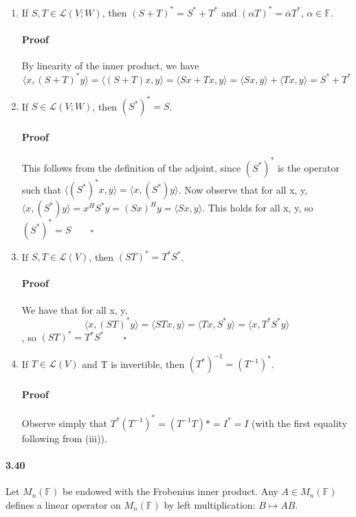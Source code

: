 \documentclass[letterpaper,12pt]{article}
\theoremstyle{definition}
\begin{document}
\begin{enumerate}[label=(\roman*)]

\item If $S, T \in \mathscr{L}(V;W)$, then $(S + T)^* = S^* + T^* $ and $(\alpha T)^* =  \overline{\alpha}T^*$, $\alpha \in \mathds{F}$.

\paragraph{Proof} By linearity of the inner product, we have
$$\langle x, (S + T)^*y \rangle = \langle (S + T)x, y \rangle 
=\langle Sx + Tx, y \rangle = \langle Sx , y \rangle + \langle Tx, y \rangle = S^* + T^* $$

\item If $S \in \mathscr{L}(V;W)$, then $(S^*)^* = S$. 

\paragraph{Proof} This follows from the definition of the adjoint, since $(S^*)^*$ is the  operator such that $\langle (S^*)^*x, y\rangle = \langle x, (S^*)y\rangle$. Now observe that for all x, y, $\langle x, (S^*)y\rangle = x^HS^*y = (Sx)^Hy = \langle Sx, y \rangle $. This holds for all x, y, so $(S^*)^* = S \qquad \square$

\item If $S, T \in \mathscr{L}(V)$, then $(ST)^* = T^*S^* $.

\paragraph{Proof} We have that for all x, y, 
$$\langle x, (ST)^*y \rangle = \langle STx, y \rangle = \langle Tx, S^*y \rangle = \langle x, T^*S^*y \rangle$$, so $(ST)^* = T^*S^* \qquad \square$

\item If $T \in \mathscr{L}(V)$ and T is invertible, then $(T^*)^{-1} = (T^{-1})^*$.

\paragraph{Proof } Observe simply that $T^*(T^{-1})^* = (T^{-1}T)* = I^* = I$ (with the first equality following from (iii)).

\end{enumerate}


\paragraph{3.40} Let $M_n(\mathds{F})$ be endowed with the Frobenius inner product. Any $A \in M_n(\mathds{F})$ defines a linear operator on $M_n(\mathds{F})$ by left multiplication: $B \mapsto AB$.
\end{document}
